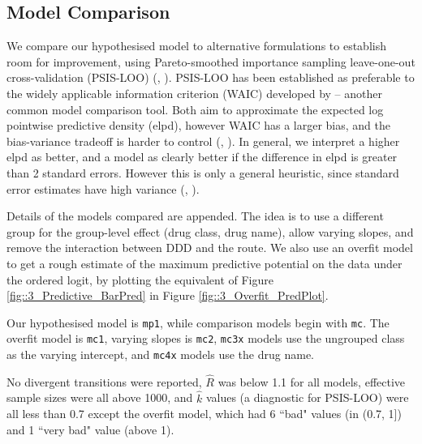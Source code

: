 \documentclass[11pt,twoside]{article}
\numberwithin{Theorem}{section}
\numberwithin{Definition}{section}
\numberwithin{Lemma}{section}
\numberwithin{Algorithm}{section}
\numberwithin{equation}{section}
\begin{document}
\newpage
\subsection{Model Comparison}

We compare our hypothesised model to alternative formulations to establish room for improvement, using Pareto-smoothed importance sampling leave-one-out cross-validation (PSIS-LOO) (\citeauthor{VehtariPSIS2017}, \citeyear{VehtariPSIS2017}). PSIS-LOO has been established as preferable to the widely applicable information criterion (WAIC) developed by \cite{WatanabeAIC} -- another common model comparison tool. Both aim to approximate the expected log pointwise predictive density (elpd), however WAIC has a larger bias, and the bias-variance tradeoff is harder to control (\citeauthor{VehtariPracEval2017}, \citeyear{VehtariPracEval2017}). In general, we interpret a higher elpd as better, and a model as clearly better if the difference in elpd is greater than 2 standard errors. However this is only a general heuristic, since standard error estimates have high variance (\citeauthor{Piironen2017}, \citeyear{Piironen2017}). 

Details of the models compared are appended. The idea is to use a different group for the group-level effect (drug class, drug name), allow varying slopes, and remove the interaction between DDD and the route. We also use an overfit model to get a rough estimate of the maximum predictive potential on the data under the ordered logit, by plotting the equivalent of Figure \ref{fig::3_Predictive_BarPred} in Figure \ref{fig::3_Overfit_PredPlot}. 

Our hypothesised model is \texttt{mp1}, while comparison models begin with \texttt{mc}. The overfit model is \texttt{mc1}, varying slopes is \texttt{mc2}, \texttt{mc3x} models  use the ungrouped class as the varying intercept, and \texttt{mc4x} models use the drug name. 

No divergent transitions were reported, $\hat{R}$ was below 1.1 for all models, effective sample sizes were all above 1000, and $\hat{k}$ values (a diagnostic for PSIS-LOO) were all less than 0.7 except the overfit model, which had 6 ``bad" values (in (0.7, 1]) and 1 ``very bad" value (above 1). 
\end{document}
